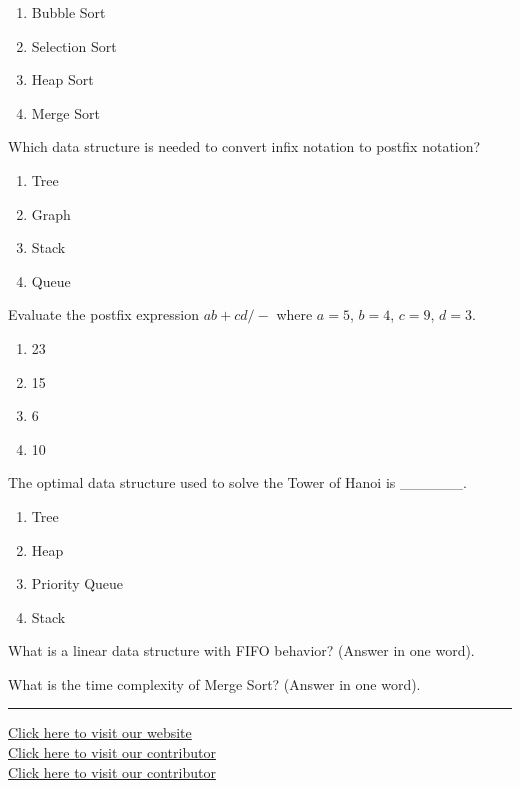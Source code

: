 \documentclass[11pt,a4paper]{article}
\begin{document}
\begin{parts}
\begin{enumerate}[label=(\alph*),itemsep=2pt]
    \item Bubble Sort
    \item Selection Sort
    \item Heap Sort
    \item Merge Sort
  \end{enumerate}
  
  \item Which data structure is needed to convert infix notation to postfix notation?
  
\begin{enumerate}[label=(\alph*),itemsep=2pt]
    \item Tree
    \item Graph
    \item Stack
    \item Queue
  \end{enumerate}
  
  \item Evaluate the postfix expression $ab + cd / -$ where $a=5$, $b=4$, $c=9$, $d=3$.
  
\begin{enumerate}[label=(\alph*),itemsep=2pt]
    \item 23
    \item 15
    \item 6
    \item 10
  \end{enumerate}
  
  \item The optimal data structure used to solve the Tower of Hanoi is \_\_\_\_\_\_.
  
\begin{enumerate}[label=(\alph*),itemsep=2pt]
    \item Tree
    \item Heap
    \item Priority Queue
    \item Stack
  \end{enumerate}
  
  \item What is a linear data structure with FIFO behavior? (Answer in one word).
  
  \item What is the time complexity of Merge Sort? (Answer in one word).
\end{parts}

\vfill
\rule{\linewidth}{0.4pt}

\begin{center}\small
\href{https://bhu-exam.vercel.app/}{Click here to visit our website}\\[4pt]\href{https://me-aryan.vercel.app/}{Click here to visit our contributor}\\[4pt]\href{https://quashan-me.vercel.app/}{Click here to visit our contributor}
\end{center}
\end{document}

